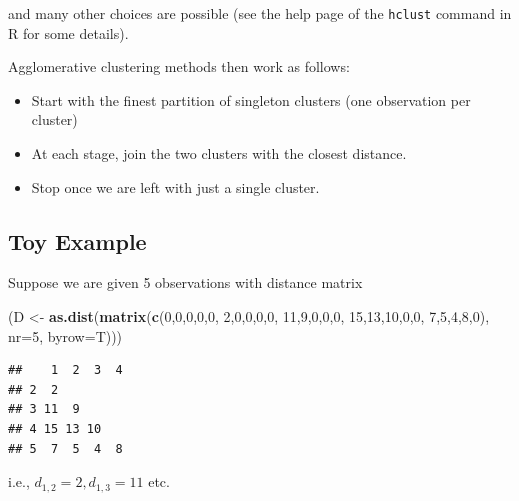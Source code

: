 \documentclass[
]{book}
\newenvironment{Shaded}{\begin{snugshade}}{\end{snugshade}}
\newcommand{\AttributeTok}[1]{\textcolor[rgb]{0.13,0.29,0.53}{#1}}
\newcommand{\DecValTok}[1]{\textcolor[rgb]{0.00,0.00,0.81}{#1}}
\newcommand{\FunctionTok}[1]{\textcolor[rgb]{0.13,0.29,0.53}{\textbf{#1}}}
\newcommand{\NormalTok}[1]{#1}
\newcommand{\OtherTok}[1]{\textcolor[rgb]{0.56,0.35,0.01}{#1}}
\theoremstyle{definition}
\theoremstyle{definition}
\theoremstyle{definition}
\theoremstyle{definition}
\theoremstyle{remark}
\begin{document}
and many other choices are possible (see the help page of the \texttt{hclust} command in R for some details).

Agglomerative clustering methods then work as follows:

\begin{itemize}
\item
  Start with the finest partition of singleton clusters (one observation per cluster)
\item
  At each stage, join the two clusters with the closest distance.
\item
  Stop once we are left with just a single cluster.
\end{itemize}

\hypertarget{toy-example}{%
\subsection{Toy Example}\label{toy-example}}

Suppose we are given 5 observations with distance matrix

\begin{Shaded}
\begin{Highlighting}[]
\NormalTok{(D }\OtherTok{\textless{}{-}} \FunctionTok{as.dist}\NormalTok{(}\FunctionTok{matrix}\NormalTok{(}\FunctionTok{c}\NormalTok{(}\DecValTok{0}\NormalTok{,}\DecValTok{0}\NormalTok{,}\DecValTok{0}\NormalTok{,}\DecValTok{0}\NormalTok{,}\DecValTok{0}\NormalTok{,}
                      \DecValTok{2}\NormalTok{,}\DecValTok{0}\NormalTok{,}\DecValTok{0}\NormalTok{,}\DecValTok{0}\NormalTok{,}\DecValTok{0}\NormalTok{,}
                      \DecValTok{11}\NormalTok{,}\DecValTok{9}\NormalTok{,}\DecValTok{0}\NormalTok{,}\DecValTok{0}\NormalTok{,}\DecValTok{0}\NormalTok{,}
                      \DecValTok{15}\NormalTok{,}\DecValTok{13}\NormalTok{,}\DecValTok{10}\NormalTok{,}\DecValTok{0}\NormalTok{,}\DecValTok{0}\NormalTok{,}
                      \DecValTok{7}\NormalTok{,}\DecValTok{5}\NormalTok{,}\DecValTok{4}\NormalTok{,}\DecValTok{8}\NormalTok{,}\DecValTok{0}\NormalTok{), }\AttributeTok{nr=}\DecValTok{5}\NormalTok{, }\AttributeTok{byrow=}\NormalTok{T)))}
\end{Highlighting}
\end{Shaded}

\begin{verbatim}
##    1  2  3  4
## 2  2         
## 3 11  9      
## 4 15 13 10   
## 5  7  5  4  8
\end{verbatim}

i.e., \(d_{1,2}=2, d_{1,3}=11\) etc.
\end{document}
